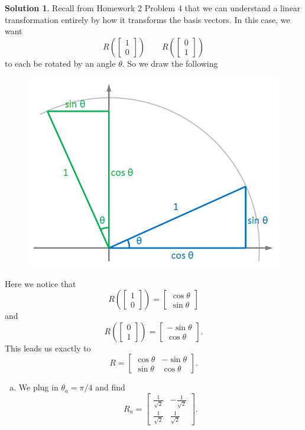 \documentclass[12pt]{report} %
\theoremstyle{definition}
\newtheorem{solution}{Solution}
\begin{document}
\begin{solution}
Recall from Homework 2 Problem 4 that we can understand a linear transformation entirely by how it transforms the basis vectors.  In this case, we want
\[
R\left( \begin{bmatrix} 1 \\ 0 \end{bmatrix} \right) \qquad R\left(\begin{bmatrix} 0 \\ 1\end{bmatrix} \right)
\]
to each be rotated by an angle $\theta$.  So we draw the following
\begin{figure}[h]
    \centering
    \includegraphics[width=.5\textwidth]{Images/rotation.png}
\end{figure}
Here we notice that
\[
R\left( \begin{bmatrix} 1 \\ 0 \end{bmatrix}\right) = \begin{bmatrix} \cos \theta \\ \sin \theta \end{bmatrix}
\]
and
\[
R\left( \begin{bmatrix} 0 \\ 1 \end{bmatrix}\right) = \begin{bmatrix} -\sin \theta \\ \cos \theta \end{bmatrix}.
\]
This leads us exactly to 
\[
R=\begin{bmatrix} \cos \theta & -\sin \theta \\ \sin \theta & \cos \theta \end{bmatrix}.
\]

\begin{enumerate}[(a)]
    \item We plug in $\theta_a = \pi/4$ and find
    \[
    R_a = \begin{bmatrix} \frac{1}{\sqrt{2}} & -\frac{1}{\sqrt{2}}\\ \frac{1}{\sqrt{2}} & \frac{1}{\sqrt{2}}\end{bmatrix}.
    \]
    

\end{enumerate}
\end{solution}
\end{document}
